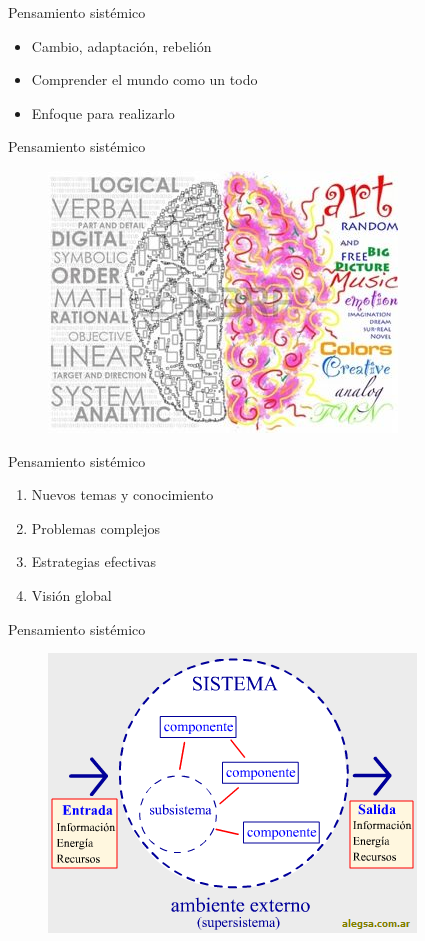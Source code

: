 \documentclass{beamer}
\begin{document}
\begin{frame}{Pensamiento sistémico}
	\begin{itemize}
		\item Cambio, adaptación, rebelión
		\item Comprender el mundo como un todo
		\item Enfoque para realizarlo
	\end{itemize}
\end{frame}

\begin{frame}{Pensamiento sistémico}
	\begin{figure}
		\centering
		\includegraphics[width=0.7\linewidth]{img/cerebro}	
	\end{figure}
\end{frame}


\begin{frame}{Pensamiento sistémico}
	\begin{enumerate}
		\item Nuevos temas y conocimiento
		\item Problemas complejos
		\item Estrategias efectivas
		\item Visión global
	\end{enumerate}
\end{frame}

\begin{frame}{Pensamiento sistémico}
	\begin{figure}
		\centering
		\includegraphics[width=0.9\linewidth]{img/sistema}	
	\end{figure}
\end{frame}
\end{document}
